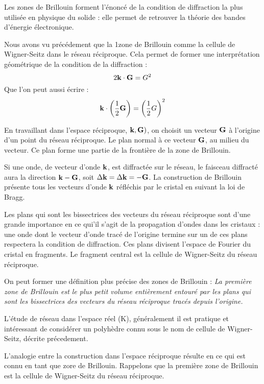 Les zones de Brillouin forment l'énoncé de la condition de diffraction la plus
utilisée en physique du solide : elle permet de retrouver la théorie des bandes
d'énergie électronique.

Nous avons vu précédement que la 1\iere zone de Brillouin comme la cellule de
Wigner-Seitz dans le réseau réciproque. Cela permet de former une interprétation
géométrique de la condition de la diffraction :
\begin{equation}
    2\mathbf{k} \cdot \mathbf{G} = G^2
\end{equation}
Que l'on peut aussi écrire :
\begin{equation}
    \mathbf{k} \cdot \left( \frac{1}{2} \mathbf{G} \right) = \left( \frac{1}{2} G \right)^2
\end{equation}

En travaillant dans l'espace réciproque, $\mathbf{k},\mathbf{G})$, on choisit un
vecteur $\mathbf{G}$ à l'origine d'un point du réseau réciproque. Le plan normal
à ce vecteur $\mathbf{G}$, au milieu du vecteur. Ce plan forme une partie de la
frontière de la zone de Brillouin.

Si une onde, de vecteur d'onde $\mathbf{k}$, est diffractée sur le réseau, le
faisceau diffracté aura la direction $\mathbf{k}-\mathbf{G}$, soit $\Delta\mathbf{k} = \Delta\mathbf{k} = -\mathbf{G}$.
La construction de Brillouin présente tous les vecteurs d'onde $\mathbf{k}$
réfléchis par le cristal en suivant la loi de Bragg.

Les plans qui sont les bissectrices des vecteurs du réseau réciproque sont d'une
grande importance en ce qui'il s'agit de la propagation d'ondes dans les
cristaux : une onde dont le vecteur d'onde tracé de l'origine termine sur un
de ces plans respectera la condition de diffraction. Ces plans divisent l'espace
de Fourier du cristal en fragments. Le fragment central est la cellule de
Wigner-Seitz du réseau réciproque.

On peut former une définition plus précise des zones de Brillouin : \emph{
    La première zone de Brillouin est le plus petit volume entièrement entouré
    par les plans qui sont les bissectrices des vecteurs du réseau réciproque
tracés depuis l'origine.}




L'étude de réseau dans l'espace réel (K), généralement il est pratique et
intéressant de considérer un polyhèdre connu sous le nom de cellule de
Wigner-Seitz, décrite précedement.

L'analogie entre la construction dans l'espace réciproque résulte en ce qui est
connu en tant que zore de Brillouin. Rappelons que la première zone de Brillouin
est la cellule de Wigner-Seitz du réseau réciproque.

